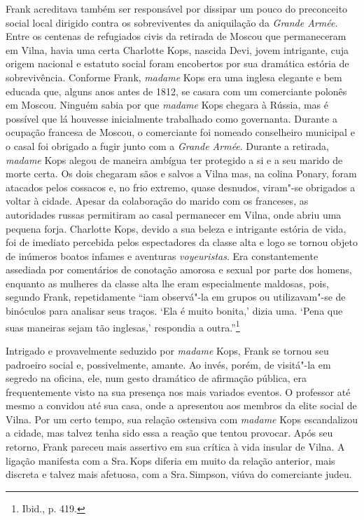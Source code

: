 Frank acreditava também ser responsável por dissipar um pouco do
preconceito social local dirigido contra os sobreviventes da aniquilação
da \textit{Grande Armée}. Entre os centenas de refugiados civis da
retirada de Moscou que permaneceram em Vilna, havia uma certa Charlotte
Kops, nascida Devi, jovem intrigante, cuja origem nacional e estatuto
social foram encobertos por sua dramática estória de sobrevivência.
Conforme Frank, \textit{madame} Kops era uma inglesa elegante e bem educada que,
alguns anos antes de 1812, se casara com um comerciante polonês em
Moscou. Ninguém sabia por que \textit{madame} Kops chegara à Rússia, mas é
possível que lá houvesse inicialmente trabalhado como governanta.
Durante a ocupação francesa de Moscou, o comerciante foi nomeado
conselheiro municipal e o casal foi obrigado a fugir junto com a
\textit{Grande Armée}. Durante a retirada, \textit{madame} Kops alegou de maneira
ambígua ter protegido a si e a seu marido de morte certa. Os dois
chegaram sãos e salvos a Vilna mas, na colina Ponary, foram atacados
pelos cossacos e, no frio extremo, quase desnudos, viram"-se obrigados a
voltar à cidade. Apesar da colaboração do marido com os franceses, as
autoridades russas permitiram ao casal permanecer em Vilna, onde abriu
uma pequena forja. Charlotte Kops, devido a sua beleza e intrigante
estória de vida, foi de imediato percebida pelos espectadores da classe
alta e logo se tornou objeto de inúmeros boatos infames e aventuras
\textit{voyeuristas}. Era constantemente assediada por comentários de conotação
amorosa e sexual por parte dos homens, enquanto as mulheres da classe
alta lhe eram especialmente maldosas, pois, segundo Frank, repetidamente
``iam observá"-la em grupos ou utilizavam"-se de binóculos para analisar
seus traços. `Ela é muito bonita,' dizia uma. `Pena que suas maneiras
sejam tão inglesas,' respondia a outra.''\footnote{Ibid., p. 419.}

%

Intrigado e provavelmente seduzido por \textit{madame} Kops, Frank se tornou seu
padroeiro social e, possivelmente, amante. Ao invés, porém, de visitá"-la
em segredo na oficina, ele, num gesto dramático de afirmação pública,
era frequentemente visto na sua presença nos mais variados eventos. O
professor até mesmo a convidou até sua casa, onde a apresentou aos
membros da elite social de Vilna. Por um certo tempo, sua relação
ostensiva com \textit{madame} Kops escandalizou a cidade, mas talvez tenha sido
essa a reação que tentou provocar. Após seu retorno, Frank pareceu mais
assertivo em sua crítica à vida insular de Vilna. A ligação manifesta
com a Sra.\,Kops diferia em muito da relação anterior, mais discreta e
talvez mais afetuosa, com a Sra.\,Simpson, viúva do comerciante judeu.

